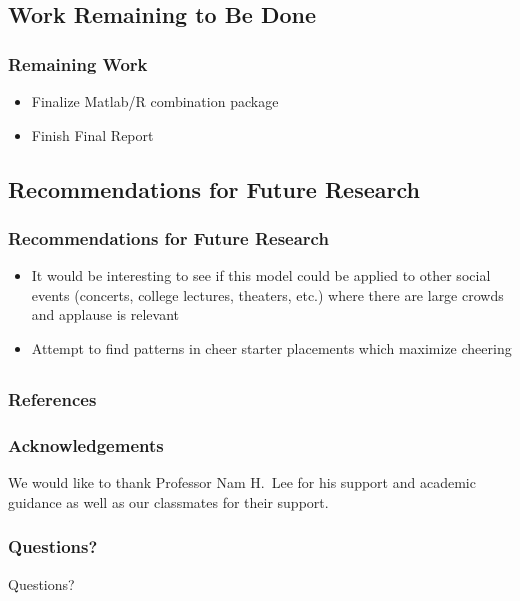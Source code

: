 \documentclass[compress,handout,10pt]{beamer}
\let\olditem\item
\renewcommand{\item}{\setlength{\itemsep}{0.5\baselineskip}\olditem}
\begin{document}
\subsection{Work Remaining to Be Done}

\begin{frame}
	\frametitle{Remaining Work}
	\begin {itemize}
		\item Finalize Matlab/R combination package
		\item Finish Final Report 
		\end {itemize}
\end{frame}

\subsection{Recommendations for Future Research}

\begin{frame}
	\frametitle {Recommendations for Future Research}
	\begin {itemize}
		\item It would be interesting to see if this model could be applied to other social events (concerts, college lectures, theaters, etc.) where there are large crowds and applause is relevant
		\item Attempt to find patterns in cheer starter placements which maximize cheering
	\end {itemize}
\end{frame}

\subsection{}

\begin {frame} [allowframebreaks]
	\frametitle{References}
	
	
\end {frame}

\begin{frame}
\frametitle{Acknowledgements}
We would like to thank Professor Nam H.~Lee for his support and academic guidance as well as our classmates for their support.
\end{frame}

\begin{frame}
	\frametitle {Questions?}
	\begin{center}
		Questions?
	\end{center}
\end{frame}
\end{document}

